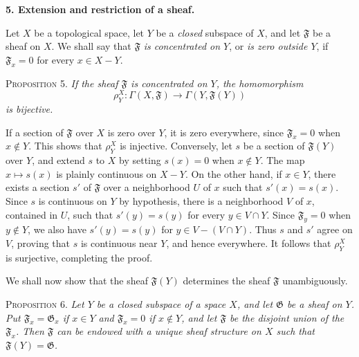 
\medskip
{}\label{fac:I:1:no:5}
\textbf{5. Extension and restriction of a sheaf.}

Let $X$ be a topological space, let $Y$ be a \textit{closed} subspace of $X$, and let $\mathfrak{F}$ be a sheaf on $X$. We shall say that $\mathfrak{F}$ \textit{is concentrated on $Y$}, or \textit{is zero outside $Y$}, if $\mathfrak{F}_x=0$ for every $x\in X-Y$.

\medskip
{}\label{fac:I:1:no:5:prop:5}
\textsc{Proposition 5.} \textit{If the sheaf $\mathfrak{F}$ is concentrated on $Y$, the homomorphism}
\begin{equation*}
\rho_Y^X:\Gamma(X,\mathfrak{F})\longrightarrow\Gamma(Y,\mathfrak{F}(Y))
\end{equation*}
\textit{is bijective.}

If a section of $\mathfrak{F}$ over $X$ is zero over $Y$, it is zero everywhere, since $\mathfrak{F}_x=0$ when $x\notin Y$. This shows that $\rho_Y^X$ is injective. Conversely, let $s$ be a section of $\mathfrak{F}(Y)$ over $Y$, and extend $s$ to $X$ by setting $s(x)=0$ when $x\notin Y$. The map $x\mapsto s(x)$ is plainly continuous on $X-Y$. On the other hand, if $x\in Y$, there exists a section $s'$ of $\mathfrak{F}$ over a neighborhood $U$ of $x$ such that $s'(x)=s(x)$. Since $s$ is continuous on $Y$ by hypothesis, there is a neighborhood $V$ of $x$, contained in $U$, such that $s'(y)=s(y)$ for every $y\in V\cap Y$. Since $\mathfrak{F}_y=0$ when $y\notin Y$, we also have $s'(y)=s(y)$ for $y\in V-(V\cap Y)$. Thus $s$ and $s'$ agree on $V$, proving that $s$ is continuous near $Y$, and hence everywhere. It follows that $\rho_Y^X$ is surjective, completing the proof.

We shall now show that the sheaf $\mathfrak{F}(Y)$ determines the sheaf $\mathfrak{F}$ unambiguously.

\medskip
{}\label{fac:I:1:no:5:prop:6}
\textsc{Proposition 6.} \textit{Let $Y$ be a closed subspace of a space $X$, and let $\mathfrak{G}$ be a sheaf on $Y$. Put $\mathfrak{F}_x=\mathfrak{G}_x$ if $x\in Y$ and $\mathfrak{F}_x=0$ if $x\notin Y$, and let $\mathfrak{F}$ be the disjoint union of the $\mathfrak{F}_x$. Then $\mathfrak{F}$ can be endowed with a unique sheaf structure on $X$ such that $\mathfrak{F}(Y)=\mathfrak{G}$.}

